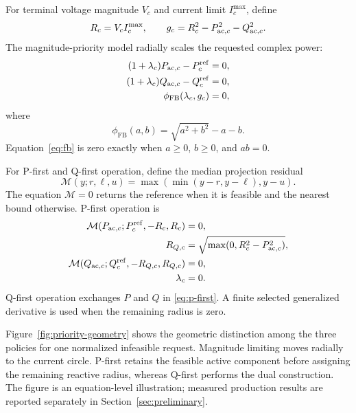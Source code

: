 For terminal voltage magnitude $V_c$ and current limit $I_c^{\max}$, define
\begin{equation}
 R_c=V_c I_c^{\max},\qquad
 g_c=R_c^2-P_{\mathrm{ac},c}^2-Q_{\mathrm{ac},c}^2.
 \label{eq:current-disk}
\end{equation}
The magnitude-priority model radially scales the requested complex power:
\begin{subequations}\label{eq:magnitude-priority}
\begin{align}
 (1+\lambda_c)P_{\mathrm{ac},c}-P_c^{\mathrm{ref}}&=0,\\
 (1+\lambda_c)Q_{\mathrm{ac},c}-Q_c^{\mathrm{ref}}&=0,\\
 \phi_{\mathrm{FB}}(\lambda_c,g_c)&=0,
\end{align}
\end{subequations}
where
\begin{equation}
 \phi_{\mathrm{FB}}(a,b)=\sqrt{a^2+b^2}-a-b.
 \label{eq:fb}
\end{equation}
Equation~\eqref{eq:fb} is zero exactly when
$a\ge0$, $b\ge0$, and $ab=0$.

For P-first and Q-first operation, define the median projection residual
\begin{equation}
 \mathcal M(y;r,\ell,u)
 =\max\!\left(\min(y-r,y-\ell),y-u\right).
 \label{eq:median}
\end{equation}
The equation $\mathcal M=0$ returns the reference when it is feasible and the
nearest bound otherwise. P-first operation is
\begin{subequations}\label{eq:p-first}
\begin{align}
 \mathcal M(P_{\mathrm{ac},c};P_c^{\mathrm{ref}},-R_c,R_c)&=0,\\
 R_{Q,c}&=\sqrt{\max(0,R_c^2-P_{\mathrm{ac},c}^2)},\\
 \mathcal M(Q_{\mathrm{ac},c};Q_c^{\mathrm{ref}},-R_{Q,c},R_{Q,c})&=0,\\
 \lambda_c&=0.
\end{align}
\end{subequations}
Q-first operation exchanges $P$ and $Q$ in \eqref{eq:p-first}. A finite
selected generalized derivative is used when the remaining radius is zero.

Figure~\ref{fig:priority-geometry} shows the geometric distinction among the
three policies for one normalized infeasible request. Magnitude limiting moves
radially to the current circle. P-first retains the feasible active component
before assigning the remaining reactive radius, whereas Q-first performs the
dual construction. The figure is an equation-level illustration; measured
production results are reported separately in Section~\ref{sec:preliminary}.


